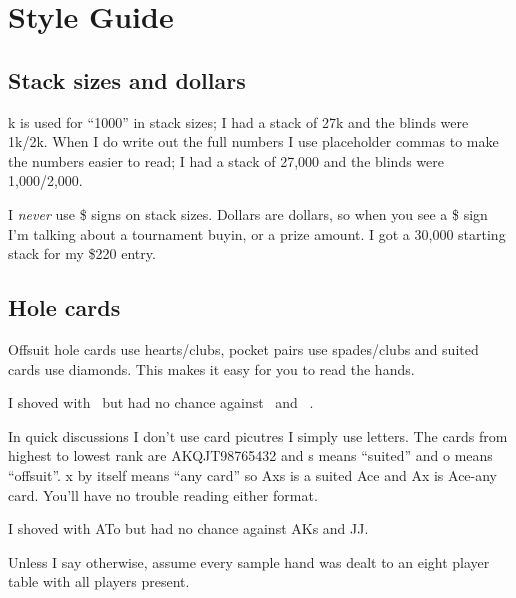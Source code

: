 \chapter{Style Guide}


\section*{Stack sizes and dollars}

k is used for ``1000'' in stack sizes; I had a stack of 27k and the
blinds were 1k/2k. When I do write out the full numbers I use
placeholder commas to make the numbers easier to read; I had a stack
of 27,000 and the blinds were 1,000/2,000.

I \textit{never} use \$ signs on stack sizes. Dollars are dollars, so
when you see a \$ sign I'm talking about a tournament buyin, or a
prize amount. I got a 30,000 starting stack for my \$220 entry.


\section*{Hole cards}

Offsuit hole cards use hearts/clubs, pocket pairs use spades/clubs and
suited cards use diamonds. This makes it easy for you to read the hands.

I shoved with \Ah\tenc\ but had no chance against \Ad\Kd\ and \Js\Jc\ .

In quick discussions I don't use card picutres I simply use
letters. The cards from highest to lowest rank are AKQJT98765432 and s
means ``suited'' and o means ``offsuit''. x by itself means ``any
card'' so Axs is a suited Ace and Ax is Ace-any card. You'll have no
trouble reading either format.

I shoved with ATo but had no chance against AKs and JJ.

Unless I say otherwise, assume every sample hand was dealt to an eight
player table with all players present.


